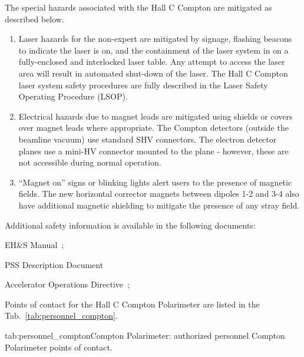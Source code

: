 {\begin{safetyen}{0}{0}
The special hazards associated with the Hall C Compton are mitigated as
described below.

\begin{enumerate}
  \item{Laser hazards for the non-expert are mitigated by signage, flashing beacons to indicate the laser is
  on, and the containment of the laser system in on a fully-enclosed and interlocked laser table. Any
  attempt to access the laser area will result in automated shut-down of the laser. The Hall C Compton
  laser system safety procedures are fully described in the Laser Safety Operating Procedure (LSOP).}
  \item{Electrical hazards due to magnet leads are mitigated using shields or covers over magnet leads where
   appropriate.  The Compton detectors (outside the beamline vacuum) use standard SHV connectors. The electron
   detector planes use a mini-HV connector mounted to the plane - however, these are not accessible during
   normal operation.}
  \item{``Magnet on'' signs or blinking lights alert users to the presence of magnetic fields. The new
  horizontal corrector magnets between dipoles 1-2 and 3-4 also have additional magnetic shielding to mitigate the
  presence of any stray field.}
\end{enumerate}

\noindent{}Additional safety information is available in the following documents:
\begin{list}{--}{\setlength{\itemsep}{-0.15cm}}
  \item EH\&S Manual~\cite{EHScebaf};
  \item PSS Description Document~\cite{PSScebaf}
  \item Accelerator Operations Directive~\cite{AODcebaf};
\end{list}


Points of contact for the Hall C Compton Polarimeter are listed in the Tab.~\ref{tab:personnel_compton}.

\begin{namestab}{tab:personnel_compton}{Compton Polarimeter: authorized personnel}{%
   Compton Polarimeter points of contact.}
\end{namestab}
\end{safetyen}
}
